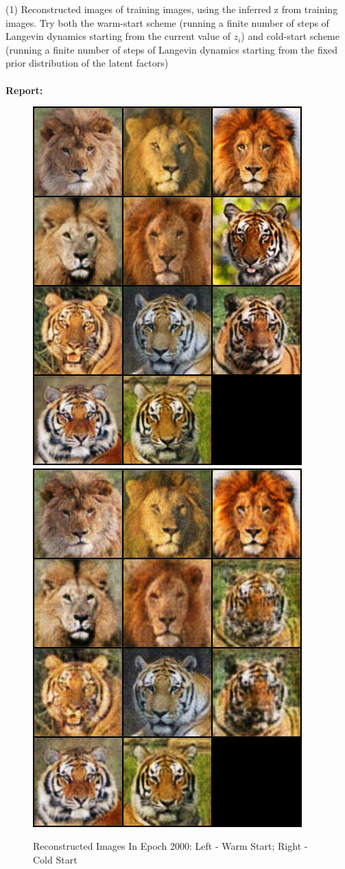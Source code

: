 \documentclass[11pt]{article}
\begin{document}
(1) Reconstructed images of training images, using the inferred z from training images. Try both the warm-start scheme (running a finite number of steps of Langevin dynamics starting from the current value of $z_i$) and cold-start scheme (running a finite number of steps of Langevin dynamics starting from the fixed prior distribution of the latent factors)
\\~\\
\textbf{Report:}
\begin{figure}
    \centering
    \includegraphics[width=.35\linewidth]{images/warm_recon.png}
    \includegraphics[width=.35\linewidth]{images/cold_recon.png}
    \caption{Reconstructed Images In Epoch 2000: Left - Warm Start; Right - Cold Start}
\end{figure}
\end{document}
